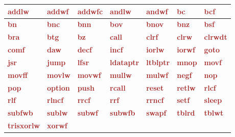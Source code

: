 \newcommand\keyWordInstruction[1]{\textcolor{brown}{\bf#1}}

\begin{tabular}{|l|l|l|l|l|l|l|}
  \hline
    \keyWordInstruction{addlw} & \keyWordInstruction{addwf} & \keyWordInstruction{addwfc} & \keyWordInstruction{andlw} & \keyWordInstruction{andwf} & \keyWordInstruction{bc} & \keyWordInstruction{bcf} \\
  \hline
    \keyWordInstruction{bn} & \keyWordInstruction{bnc} & \keyWordInstruction{bnn} & \keyWordInstruction{bov} & \keyWordInstruction{bnov} & \keyWordInstruction{bnz} & \keyWordInstruction{bsf} \\
  \hline
    \keyWordInstruction{bra} & \keyWordInstruction{btg} & \keyWordInstruction{bz} & \keyWordInstruction{call} & \keyWordInstruction{clrf} & \keyWordInstruction{clrw} & \keyWordInstruction{clrwdt} \\
  \hline
    \keyWordInstruction{comf} & \keyWordInstruction{daw} & \keyWordInstruction{decf} & \keyWordInstruction{incf} & \keyWordInstruction{iorlw} & \keyWordInstruction{iorwf} & \keyWordInstruction{goto} \\
  \hline
    \keyWordInstruction{jsr} & \keyWordInstruction{jump} & \keyWordInstruction{lfsr} & \keyWordInstruction{ldataptr} & \keyWordInstruction{ltblptr} & \keyWordInstruction{mnop} & \keyWordInstruction{movf} \\
  \hline
    \keyWordInstruction{movff} & \keyWordInstruction{movlw} & \keyWordInstruction{movwf} & \keyWordInstruction{mullw} & \keyWordInstruction{mulwf} & \keyWordInstruction{negf} & \keyWordInstruction{nop} \\
  \hline
    \keyWordInstruction{pop} & \keyWordInstruction{option} & \keyWordInstruction{push} & \keyWordInstruction{rcall} & \keyWordInstruction{reset} & \keyWordInstruction{retlw} & \keyWordInstruction{rlcf} \\
  \hline
    \keyWordInstruction{rlf} & \keyWordInstruction{rlncf} & \keyWordInstruction{rrcf} & \keyWordInstruction{rrf} & \keyWordInstruction{rrncf} & \keyWordInstruction{setf} & \keyWordInstruction{sleep} \\
  \hline
    \keyWordInstruction{subfwb} & \keyWordInstruction{sublw} & \keyWordInstruction{subwf} & \keyWordInstruction{subwfb} & \keyWordInstruction{swapf} & \keyWordInstruction{tblrd} & \keyWordInstruction{tblwt}\\
  \hline
    \keyWordInstruction{tris}\keyWordInstruction{xorlw} & \keyWordInstruction{xorwf} & & & & & \\
  \hline
\end{tabular}

